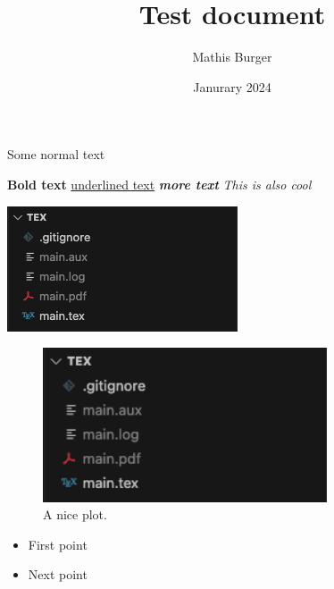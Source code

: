 \documentclass[12pt, letterpaper]{article}
\title{Test document}
\author{Mathis Burger}
\date{Janurary 2024}
\begin{document}
\maketitle

Some normal text

\textbf{Bold text}
\underline{underlined text}
\textbf{\textit{more text}}
\emph{This is also cool}

\includegraphics{img1}  

\begin{figure}[h]
    \centering
    \includegraphics[width=0.75\textwidth]{img1}
    \caption{A nice plot.}
    \label{fig:mesh1}
\end{figure}

\begin{itemize}
\item First point
\item Next point
\end{itemize}
\end{document}
